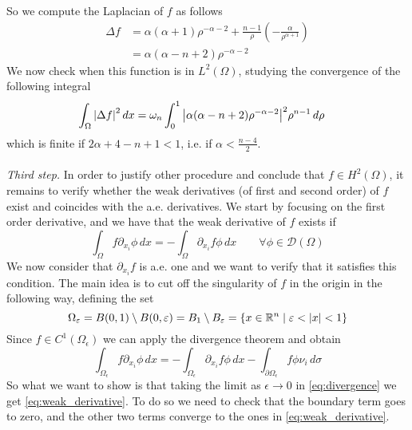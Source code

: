 So we compute the Laplacian of \(f\) as follows
\begin{align*}
    \Delta f & = \alpha (\alpha + 1) \rho^{-\alpha - 2} + \frac{n-1}{\rho} \left(-\frac{\alpha}{\rho^{\alpha + 1}}\right) \\
             & = \alpha (\alpha - n + 2) \rho^{-\alpha - 2}
\end{align*}
We now check when this function is in \(L^2(\Omega)\), studying the convergence of the following integral
\begin{align*}
    \int_\Omega \abs{\Delta f}^2 \, dx & = \omega_n \int_0^1 \abs{\alpha (\alpha - n + 2) \rho^{-\alpha - 2}}^2 \rho^{n-1} \, d\rho
\end{align*}
which is finite if \(2\alpha + 4 - n + 1 < 1\), i.e. if \(\alpha < \frac{n-4}{2}\).\\
\vspace{0.1cm}\\
\textit{Third step.} In order to justify other procedure and conclude that $f \in H^2(\Omega)$,
it remains to verify whether the weak derivatives (of first and second order) of \(f\) exist
and coincides with the a.e. derivatives.
We start by focusing on the first order derivative, and we have that the weak derivative of \(f\) exists if
\begin{equation}\label{eq:weak_derivative}
    \int_\Omega f \partial_{x_i} \phi \, dx = - \int_\Omega \partial_{x_i} f \phi \, dx \qquad \forall \phi \in \mathcal{D}(\Omega)
\end{equation}
We now consider that $\partial_{x_i} f$ is a.e. one and we want to verify that it satisfies this condition.
The main idea is to cut off the singularity of \(f\) in the origin in the following way, defining the set
\[
    \Omega_\varepsilon = B(0, 1) \setminus B(0, \varepsilon) = B_1 \setminus B_\varepsilon = \left\{ x \in \mathbb{R}^n \mid \varepsilon < \abs{x} < 1 \right\}
\]
Since \(f \in C^1(\Omega_\epsilon)\) we can apply the divergence theorem and
obtain
\begin{equation}\label{eq:divergence}
    \int_{\Omega_\epsilon} f \partial_{x_i} \phi \, dx = -\int_{\Omega_\epsilon} \partial_{x_i} f \phi \, dx - \int_{\partial\Omega_\epsilon} f \phi \nu_i \, d\sigma
\end{equation}
So what we want to show is that taking the limit as \(\epsilon \to 0\) in \eqref{eq:divergence} we get \eqref{eq:weak_derivative}.
To do so we need to check that the boundary term goes to zero, and the other two terms converge to the ones in \eqref{eq:weak_derivative}. \\
